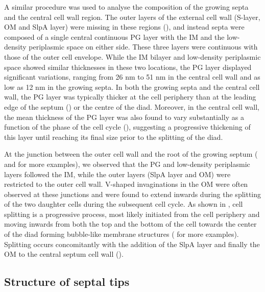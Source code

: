 A similar procedure was used to analyse the composition of the growing septa and the central cell wall region.
The outer layers of the external cell wall (S-layer, OM and SlpA layer) were missing in these regions (), and instead septa were composed of a single central continuous PG layer with the IM and the low-density periplasmic space on either side.
These three layers were continuous with those of the outer cell envelope.
While the IM bilayer and low-density periplasmic space showed similar thicknesses in these two locations, the PG layer displayed significant variations, ranging from 26 nm to 51 nm in the central cell wall and as low as 12 nm in the growing septa.
In both the growing septa and the central cell wall, the PG layer was typically thicker at the cell periphery than at the leading edge of the septum () or the centre of the diad.
Moreover, in the central cell wall, the mean thickness of the PG layer was also found to vary substantially as a function of the phase of the cell cycle (), suggesting a progressive thickening of this layer until reaching its final size prior to the splitting of the diad.

At the junction between the outer cell wall and the root of the growing septum ( and  for more examples), we observed that the PG and low-density periplasmic layers followed the IM, while the outer layers (SlpA layer and OM) were restricted to the outer cell wall.
V-shaped invaginations in the OM were often observed at these junctions and were found to extend inwards during the splitting of the two daughter cells during the subsequent cell cycle.
As shown in , cell splitting is a progressive process, most likely initiated from the cell periphery and moving inwards from both the top and the bottom of the cell towards the center of the diad forming bubble-like membrane structures ( for more examples).
Splitting occurs concomitantly with the addition of the SlpA layer and finally the OM to the central septum cell wall ().


\subsection{Structure of septal tips}

